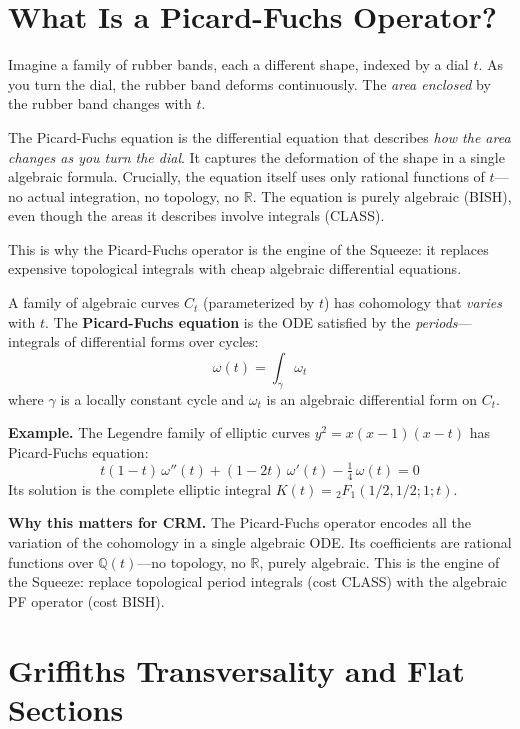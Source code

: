 \documentclass[11pt,twoside,openany]{report}
\theoremstyle{remark}
\newcommand{\BISH}{\textsf{BISH}}
\newcommand{\CLASS}{\textsf{CLASS}}
\begin{document}
\section{What Is a Picard-Fuchs Operator?}

\begin{analogybox}
Imagine a family of rubber bands, each a different shape, indexed by a dial $t$. As you turn the dial, the rubber band deforms continuously. The \emph{area enclosed} by the rubber band changes with $t$.

The Picard-Fuchs equation is the differential equation that describes \emph{how the area changes as you turn the dial}. It captures the deformation of the shape in a single algebraic formula. Crucially, the equation itself uses only rational functions of $t$---no actual integration, no topology, no $\mathbb{R}$. The equation is purely algebraic (\BISH), even though the areas it describes involve integrals (\CLASS).

This is why the Picard-Fuchs operator is the engine of the Squeeze: it replaces expensive topological integrals with cheap algebraic differential equations.
\end{analogybox}

A family of algebraic curves $C_t$ (parameterized by $t$) has cohomology that \emph{varies} with $t$. The \textbf{Picard-Fuchs equation} is the ODE satisfied by the \emph{periods}---integrals of differential forms over cycles:
\[
  \omega(t) = \int_\gamma \omega_t
\]
where $\gamma$ is a locally constant cycle and $\omega_t$ is an algebraic differential form on $C_t$.

\textbf{Example.} The Legendre family of elliptic curves $y^2 = x(x-1)(x-t)$ has Picard-Fuchs equation:
\[
  t(1-t)\,\omega''(t) + (1-2t)\,\omega'(t) - \tfrac{1}{4}\,\omega(t) = 0
\]
Its solution is the complete elliptic integral $K(t) = {}_2F_1(1/2, 1/2; 1; t)$.

\textbf{Why this matters for CRM.} The Picard-Fuchs operator encodes all the variation of the cohomology in a single algebraic ODE. Its coefficients are rational functions over $\mathbb{Q}(t)$---no topology, no $\mathbb{R}$, purely algebraic. This is the engine of the Squeeze: replace topological period integrals (cost \CLASS) with the algebraic PF operator (cost \BISH).


\section{Griffiths Transversality and Flat Sections}
\end{document}
